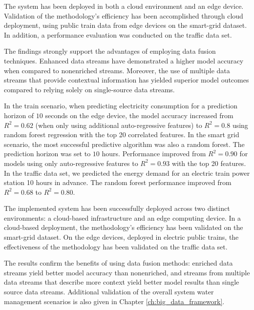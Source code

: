 The system has been deployed in both a cloud environment and an edge device. 
Validation of the methodology's efficiency has been accomplished through cloud deployment, using public train data from edge devices on the smart-grid dataset. In addition, a performance evaluation was conducted on the traffic data set.

The findings strongly support the advantages of employing data fusion techniques. Enhanced data streams have demonstrated a higher model accuracy when compared to nonenriched streams. Moreover, the use of multiple data streams that provide contextual information has yielded superior model outcomes compared to relying solely on single-source data streams.

In the train scenario, when predicting electricity consumption for a prediction horizon of $10$ seconds on the edge device, the model accuracy increased from $R^2=0.62$ (when only using additional auto-regressive features) to $R^2=0.8$ using random forest regression with the top 20 correlated features.
In the smart grid scenario, the most successful predictive algorithm was also a random forest.
The prediction horizon was set to $10$ hours.
Performance improved from $R^2 = 0.90$ for models using only auto-regressive features to $R^2 = 0.93$ with the top 20 features.
In the traffic data set, we predicted the energy demand for an electric train power station 10 hours in advance.
The random forest performance improved from $R^2 = 0.68$ to $R^2 = 0.80$.

The implemented system has been successfully deployed across two distinct environments: a cloud-based infrastructure and an edge computing device.
In a cloud-based deployment, the methodology's efficiency has been validated on the smart-grid dataset. 
On the edge devices, deployed in electric public trains, the effectiveness of the methodology has been validated on the traffic data set.

The results confirm the benefits of using data fusion methods: enriched data streams yield better model accuracy than nonenriched, and streams from multiple data streams that describe more context yield better model results than single source data streams.
Additional validation of the overall system water management scenarios is also given in Chapter \ref{ch:big_data_framework}.

